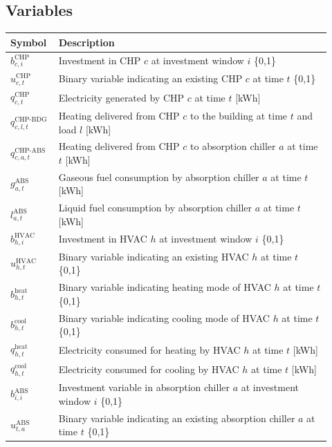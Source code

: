 \documentclass[11pt]{article}
\begin{document}
\subsection{Variables}
\label{sec:vals}

\begin{center}
\centering
\begin{tabular}{p{0.12\linewidth}p{0.8\linewidth}}
\hline
\textbf{Symbol} & \textbf{Description} \\
\hline
\(b^\text{CHP}_{c,i}\) & Investment in CHP \(c\) at investment window \(i\) \{0,1\} \\
\(u^\text{CHP}_{c,t}\) & Binary variable indicating an existing CHP \(c\) at time \(t\) \{0,1\} \\
\(q^\text{CHP}_{c,t}\) & Electricity generated by CHP \(c\) at time \(t\) [kWh] \\
\(q^\text{CHP-BDG}_{c,l,t}\) & Heating delivered from CHP \(c\) to the building at time \(t\) and load \(l\) [kWh] \\
\(q^\text{CHP-ABS}_{c,a,t}\) & Heating delivered from CHP \(c\) to absorption chiller \(a\) at time \(t\) [kWh] \\
\(g^\text{ABS}_{a,t}\) & Gaseous fuel consumption by absorption chiller \(a\) at time \(t\) [kWh] \\
\(l^\text{ABS}_{a,t}\) & Liquid fuel consumption by absorption chiller \(a\) at time \(t\) [kWh] \\
\(b^\text{HVAC}_{h,i}\) & Investment in HVAC \(h\) at investment window \(i\) \{0,1\} \\
\(u^\text{HVAC}_{h,t}\) & Binary variable indicating an existing HVAC \(h\) at time \(t\) \{0,1\} \\
\(b^\text{heat}_{h,t}\) & Binary variable indicating heating mode of HVAC \(h\) at time \(t\) \{0,1\} \\
\(b^\text{cool}_{h,t}\) & Binary variable indicating cooling mode of HVAC \(h\) at time \(t\) \{0,1\} \\
\(q^\text{heat}_{h,t}\) & Electricity consumed for heating by HVAC \(h\) at time \(t\) [kWh] \\
\(q^\text{cool}_{h,t}\) & Electricity consumed for cooling by HVAC \(h\) at time \(t\) [kWh] \\
\(b^\text{ABS}_{i,i}\) & Investment variable in absorption chiller \(a\) at investment window \(i\) \{0,1\} \\
\(u^\text{ABS}_{t,a}\) & Binary variable indicating an existing absorption chiller \(a\) at time \(t\) \{0,1\} \\

\end{tabular}
\end{center}
\end{document}
